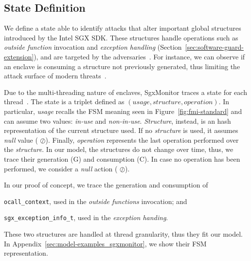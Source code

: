 \subsection{State Definition}
\label{ssec:state}

We define a state able to identify attacks that alter important global 
structures introduced by the Intel SGX SDK.
These structures handle operations such as \emph{outside function} 
invocation and \emph{exception handling} 
(Section~\ref{sec:software-guard-extension}), and are targeted by the 
adversaries~\citep{biondo2018guard,lee2017hacking}.
For instance, we can observe if an enclave is consuming a structure not 
previously generated, thus limiting the attack surface of 
modern threats~\citep{biondo2018guard,lee2017hacking}.

Due to the multi-threading nature of enclaves, SgxMonitor 
traces a state for each thread~\citep{intel-developer-guide}.
The state is a triplet defined as $(usage, structure, operation)$.
In particular, \emph{usage} recalls the FSM meaning seen in 
Figure~\ref{fig:fmi-standard} and can assume two values: \emph{in-use} and 
\emph{non-in-use}.
\emph{Structure}, instead, is an hash representation of the current structure 
used. If no \emph{structure} is used, it assumes \emph{null} value (\ie 
$\oslash$).
Finally, \emph{operation} represents the last operation performed over the 
\emph{structure}. In our model, the structures do not change over time, thus, 
we trace their generation (\ie G) and consumption (\ie C).
In case no operation has been performed, we consider a \emph{null} action (\ie 
$\oslash$).

In our proof of concept, we trace the generation and consumption of
\begin{enumerate*}[label=(\roman*)]
	\item \texttt{ocall\_context}, used in the \emph{outside 
		functions} invocation; and
	\item \texttt{sgx\_exception\_info\_t}, used in the 	
	\emph{exception handing}.
\end{enumerate*} 
These two structures are handled at thread granularity, thus they fit 
our model.
In Appendix~\ref{sec:model-examples_sgxmonitor}, we show their FSM 
representation.


